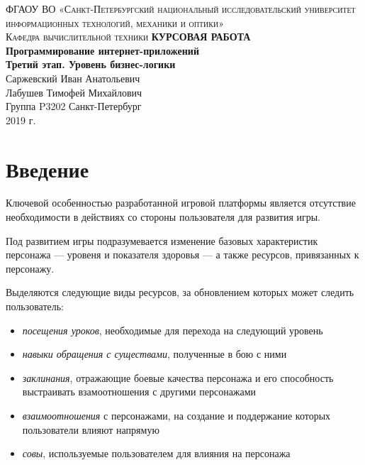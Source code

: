 \documentclass[12pt, a4paper]{article}
\begin{document}
\begin{titlepage}
\begin{center}

\textsc{ФГАОУ ВО «Санкт-Петербургский национальный исследовательский университет информационных технологий, механики и оптики»\\[4mm]
Кафедра вычислительной техники}
\vfill
\textbf{КУРСОВАЯ РАБОТА\\[4mm]
Программирование интернет-приложений\\[4mm]
Третий этап. Уровень бизнес-логики}\\[16mm]
Саржевский Иван Анатольевич
\\[2mm]Лабушев Тимофей Михайлович
\\[2mm]Группа P3202
\vfill
Санкт-Петербург\\[2mm]
2019 г.
\end{center}
\end{titlepage}


\section*{Введение}

Ключевой особенностью разработанной игровой платформы является отсутствие
необходимости в действиях со стороны пользователя для развития игры.

Под развитием игры подразумевается изменение базовых характеристик персонажа —
уровеня и показателя здоровья — а также ресурсов, привязанных к персонажу.

Выделяются следующие виды ресурсов, за обновлением которых может следить пользователь:

\begin{itemize}
\item \textit{посещения уроков}, необходимые для перехода на следующий уровень
\item \textit{навыки обращения с существами}, полученные в бою с ними
\item \textit{заклинания}, отражающие боевые качества персонажа и его способность 
  выстраивать взамоотношения с другими персонажами
\item \textit{взаимоотношения} с персонажами, на создание и поддержание которых
  пользователи влияют напрямую
\item \textit{совы}, используемые пользователем для влияния на персонажа
\end{itemize}
\end{document}
